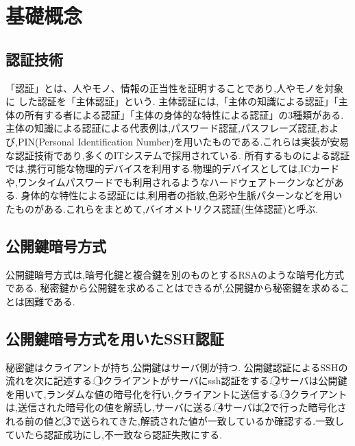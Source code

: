\chapter{基礎概念}
\label{chap:concept}

\section{認証技術}
「認証」とは、人やモノ、情報の正当性を証明することであり,人やモノを対象に した認証を「主体認証」\cite{technology-authentication}という.
主体認証には,「主体の知識による認証」「主体の所有する者による認証」「主体の身体的な特性による認証」の3種類がある.
主体の知識による認証による代表例は,パスワード認証,パスフレーズ認証,および,PIN(Personal Identification Number)を用いたものである.これらは実装が安易な認証技術であり,多くのITシステムで採用されている\cite{technology-authentication-2}.
所有するものによる認証では,携行可能な物理的デバイスを利用する.物理的デバイスとしては,ICカードや,ワンタイムパスワードでも利用されるようなハードウェアトークンなどがある\cite{technology-authentication-2}.
身体的な特性による認証には,利用者の指紋,色彩や生脈パターンなどを用いたものがある.これらをまとめて,バイオメトリクス認証(生体認証)と呼ぶ\cite{technology-authentication-2}.

\section{公開鍵暗号方式}
公開鍵暗号方式は,暗号化鍵と複合鍵を別のものとするRSAのような暗号化方式\cite{technology-SSH_authentication}である. 
秘密鍵から公開鍵を求めることはできるが,公開鍵から秘密鍵を求めることは困難\cite{technology-SSH_authentication}である.

\section{公開鍵暗号方式を用いたSSH認証}%
秘密鍵はクライアントが持ち,公開鍵はサーバ側が持つ.
公開鍵認証によるSSHの流れを次に記述する.
\textcircled{\scriptsize 1}クライアントがサーバにssh認証をする.
\textcircled{\scriptsize 2}サーバは公開鍵を用いて,ランダムな値の暗号化を行い,クライアントに送信する.
\textcircled{\scriptsize 3}クライアントは,送信された暗号化の値を解読し,サーバに送る.
\textcircled{\scriptsize 4}サーバは,\textcircled{\scriptsize 2}で行った暗号化される前の値と,\textcircled{\scriptsize 3}で送られてきた,解読された値が一致しているか確認する.一致していたら認証成功にし,不一致なら認証失敗にする.



